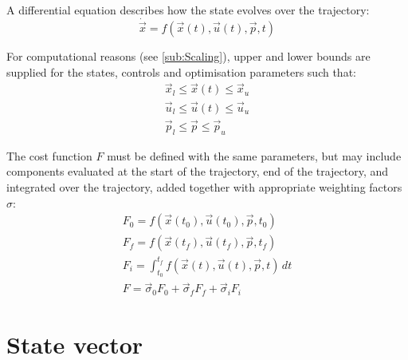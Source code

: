 A differential equation describes how the state evolves over the trajectory:
\begin{equation}\label{eq:generic-DE}
\dot{\vec{x}} = f(\vec{x}(t),\vec{u}(t),\vec{p},t)
\end{equation}

For computational reasons (see \autoref{sub:Scaling}), upper and lower bounds are supplied for the states, controls and optimisation parameters such that:
\begin{gather}
\vec{x}_l\le\vec{x}(t)\le\vec{x}_u \label{eq:state-bounds}\\
\vec{u}_l\le\vec{u}(t)\le\vec{u}_u \label{eq:control-bounds}\\
\vec{p}_l\le\vec{p}\le\vec{p}_u \label{eq:parameter-bounds}
\end{gather}

The cost function $F$ must be defined with the same parameters, but may include components evaluated at the start of the trajectory, end of the trajectory, and integrated over the trajectory, added together with appropriate weighting factors $\sigma$:
\begin{gather}
F_0=f(\vec{x}(t_0),\vec{u}(t_0),\vec{p},t_0) \label{eq:init-cost}\\
F_f=f(\vec{x}(t_f),\vec{u}(t_f),\vec{p},t_f) \label{eq:final-cost}\\
F_i=\int^{t_f}_{t_0}f(\vec{x}(t),\vec{u}(t),\vec{p},t)\,dt \label{eq:integral-cost} \\
F = \vec\sigma_0 F_0+\vec\sigma_f F_f+\vec\sigma_i F_i \label{eq:total-cost}
\end{gather}

\section{State vector} \label{sec:state-vector}

